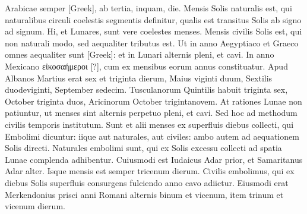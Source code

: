 Arabicae semper \textgreek{[Greek]},
ab tertia, inquam, die.
Mensis Solis naturalis est,
qui naturalibus circuli coelestis segmentis definitur, qualis est transitus
Solis ab signo ad signum.
Hi, et Lunares, sunt vere coelestes menses.
Mensis civilis Solis est, qui non naturali modo,
 sed aequaliter tributus
est.
Ut in anno Aegyptiaco et Graeco omnes aequaliter sunt
 \textgreek{[Greek]}: et in Lunari alternis pleni, et cavi.
In anno Mexicano \textgreek{εἰκοσαήμεροι [?]},
cum ex  mensibus eorum annus constituatur.
Apud Albanos
Martius erat sex et triginta dierum, Maius viginti duum, Sextilis
duodeviginti, September sedecim.
Tusculanorum Quintilis habuit
triginta sex, October triginta duos, Aricinorum October trigintanovem.
At rationes Lunae non patiuntur, ut menses sint alternis
perpetuo pleni, et cavi.
Sed hoc ad methodum civilis temporis institutum.
Sunt et alii menses ex superfluis diebus collecti, qui Embolimi
dicuntur: iique aut naturales, aut civiles: ambo autem ad aequationem
Solis directi.
Naturales embolimi sunt, qui ex Solis excessu collecti
ad spatia Lunae complenda adhibentur.
Cuiusmodi est Iudaicus
Adar prior, et Samaritanus Adar alter.
Isque mensis est semper tricenum dierum.
Civilis embolimus, qui ex diebus Solis superfluis consurgens
fulciendo anno cavo adiictur.
Eiusmodi erat Merkendonius
prisci anni Romani alternis binum et vicenum, item trinum et vicenum
dierum.

